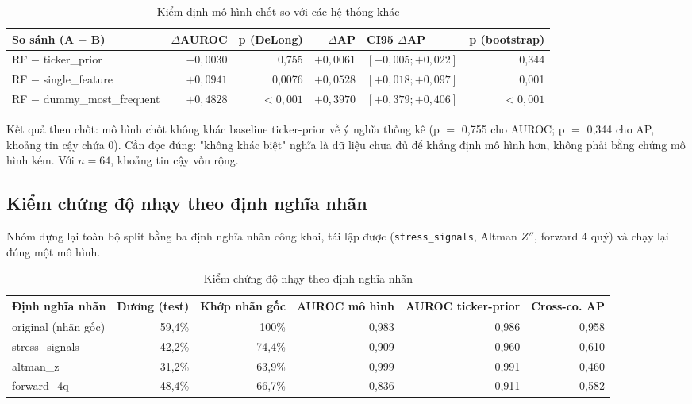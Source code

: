 \begin{table}[H]
\centering
\caption{Kiểm định mô hình chốt so với các hệ thống khác}
\label{tab:significance}
\begin{tabular}{|l|r|r|r|l|r|}
\hline
\textbf{So sánh (A $-$ B)} & \textbf{$\Delta$AUROC} & \textbf{p (DeLong)} & \textbf{$\Delta$AP} &
\textbf{CI95 $\Delta$AP} & \textbf{p (bootstrap)} \\
\hline
RF $-$ ticker\_prior        & $-0{,}0030$ & 0,755  & $+0{,}0061$ & $[-0{,}005; +0{,}022]$ & 0,344 \\
RF $-$ single\_feature      & $+0{,}0941$ & 0,0076 & $+0{,}0528$ & $[+0{,}018; +0{,}097]$  & 0,001 \\
RF $-$ dummy\_most\_frequent& $+0{,}4828$ & $<0{,}001$ & $+0{,}3970$ & $[+0{,}379; +0{,}406]$ & $<0{,}001$ \\
\hline
\end{tabular}
\end{table}

Kết quả then chốt: mô hình chốt không khác baseline ticker-prior về ý nghĩa thống kê (p $=$ 0,755 cho
AUROC; p $=$ 0,344 cho AP, khoảng tin cậy chứa 0). Cần đọc đúng: "không khác biệt" nghĩa là dữ liệu
chưa đủ để khẳng định mô hình hơn, không phải bằng chứng mô hình kém. Với $n = 64$, khoảng tin cậy
vốn rộng.

\subsection{Kiểm chứng độ nhạy theo định nghĩa nhãn}
\label{sec:nhan}

Nhóm dựng lại toàn bộ split bằng ba định nghĩa nhãn công khai, tái lập được (\texttt{stress\_signals},
Altman $Z''$, forward 4 quý) và chạy lại đúng một mô hình.

\begin{table}[H]
\centering
\caption{Kiểm chứng độ nhạy theo định nghĩa nhãn}
\label{tab:label_sensitivity}
\begin{tabular}{|l|r|r|r|r|r|}
\hline
\textbf{Định nghĩa nhãn} & \textbf{Dương (test)} & \textbf{Khớp nhãn gốc} &
\textbf{AUROC mô hình} & \textbf{AUROC ticker-prior} & \textbf{Cross-co. AP} \\
\hline
original (nhãn gốc) & 59,4\% & 100\% & 0,983 & 0,986 & 0,958 \\
stress\_signals     & 42,2\% & 74,4\%& 0,909 & 0,960 & 0,610 \\
altman\_z           & 31,2\% & 63,9\%& 0,999 & 0,991 & 0,460 \\
forward\_4q         & 48,4\% & 66,7\%& 0,836 & 0,911 & 0,582 \\
\hline
\end{tabular}
\end{table}

